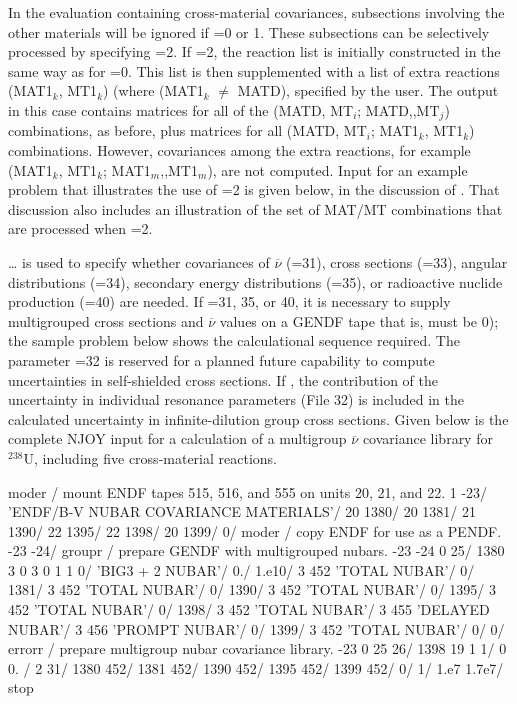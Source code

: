 In the evaluation containing cross-material covariances, subsections
involving the other materials will be ignored if =0 or
1.  These subsections can be selectively processed by
specifying =2.  If =2, the reaction list is
initially constructed in the same way as for =0.  This
list is then supplemented with a list of extra reactions (MAT1$_k$,
MT1$_k$) (where (MAT1$_k$ $\neq$ MATD), specified by the user.  The
output in this case contains matrices for all of the (MATD, MT$_i$;
MATD,,MT$_j$) combinations, as before, plus matrices for all
(MATD, MT$_i$; MAT1$_k$, MT1$_k$) combinations.  However, covariances
among the extra reactions, for example (MAT1$_k$, MT1$_k$;
MAT1$_m$,,MT1$_m$), are not computed.  Input for an example problem that
illustrates the use of =2 is given below, in the
discussion of .  That discussion also includes an
illustration of the set of MAT/MT combinations that
are processed when =2.

 \ldots\hspace{.1in} is used to specify whether
covariances of $\overline{\nu}$ (=31), cross
sections (=33), angular distributions (=34),
secondary energy distributions (=35), or radioactive nuclide
production (=40) are needed.  If =31, 35, or 40,
it is necessary to supply multigrouped
cross sections and $\overline{\nu}$ values on a GENDF tape
that is,  must be 0); the sample problem below shows
the calculational sequence required.  The parameter =32
is reserved for a planned future capability to compute
uncertainties in self-shielded cross sections.  If ,
the contribution of the uncertainty in individual resonance parameters
(File 32) is included in the calculated uncertainty in
infinite-dilution group cross sections.  Given below is the complete
NJOY input for a calculation of a multigroup $\overline{\nu}$
covariance library for $^{238}$U, including five cross-material
reactions.

\small
\begin{ccode}

   moder / mount ENDF tapes 515, 516, and 555 on units 20, 21, and 22.
   1 -23/
   'ENDF/B-V NUBAR COVARIANCE MATERIALS'/
   20 1380/
   20 1381/
   21 1390/
   22 1395/
   22 1398/
   20 1399/
   0/
   moder / copy ENDF for use as a PENDF.
   -23 -24/
   groupr / prepare GENDF with multigrouped nubars.
   -23 -24 0 25/
   1380 3 0 3 0 1 1 0/
   'BIG3 + 2 NUBAR'/
   0./
   1.e10/
   3 452 'TOTAL NUBAR'/
   0/
   1381/
   3 452 'TOTAL NUBAR'/
   0/
   1390/
   3 452 'TOTAL NUBAR'/
   0/
   1395/
   3 452 'TOTAL NUBAR'/
   0/
   1398/
   3 452 'TOTAL NUBAR'/
   3 455 'DELAYED NUBAR'/
   3 456 'PROMPT NUBAR'/
   0/
   1399/
   3 452 'TOTAL NUBAR'/
   0/
   0/
   errorr / prepare multigroup nubar covariance library.
   -23 0 25 26/
   1398 19 1 1/
   0 0. /
   2 31/
   1380 452/
   1381 452/
   1390 452/
   1395 452/
   1399 452/
   0/
   1/
   1.e7 1.7e7/
   stop

\end{ccode}
\normalsize


